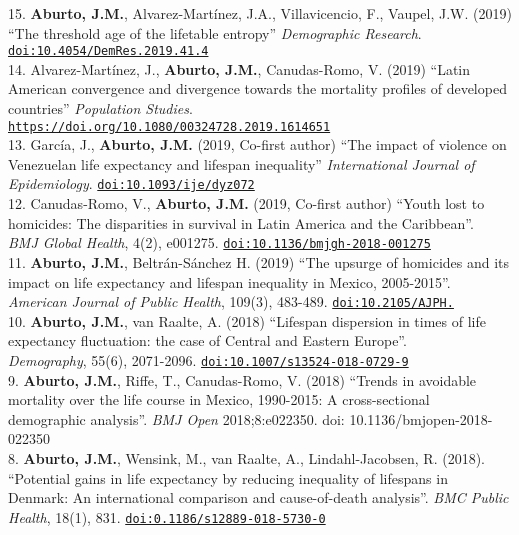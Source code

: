 \documentclass[12pt]{article}
\providecommand*\url[1]{\href{#1}{#1}}
\renewcommand*\url[1]{\href{#1}{\texttt{#1}}}
\begin{document}
15. \textbf{Aburto, J.M.}, Alvarez-Mart\'inez, J.A., Villavicencio, F., Vaupel, J.W. (2019) ``The threshold age of the lifetable entropy''  \textit{Demographic Research}. \url{doi:10.4054/DemRes.2019.41.4}\\

14. Alvarez-Mart\'inez, J., \textbf{Aburto, J.M.}, Canudas-Romo, V. (2019) ``Latin American convergence and divergence towards the mortality profiles of developed countries''\textit{ Population Studies}.\\ \url{https://doi.org/10.1080/00324728.2019.1614651} \\
  
13. Garc\'ia, J., \textbf{Aburto, J.M.} (2019, Co-first author) ``The impact of violence on Venezuelan life expectancy and lifespan inequality''  \textit{International Journal of Epidemiology}. \url{doi:10.1093/ije/dyz072}\\

12. Canudas-Romo, V., \textbf{Aburto, J.M.} (2019, Co-first author) ``Youth lost to homicides: The disparities in survival in Latin America and the Caribbean''. \\ \textit{BMJ Global Health}, 4(2), e001275. \url{doi:10.1136/bmjgh-2018-001275}\\

11. \textbf{Aburto, J.M.}, Beltr\'an-S\'anchez H. (2019) ``The upsurge of homicides and its impact on life expectancy and lifespan inequality in Mexico, 2005-2015''. \textit{ American Journal of Public Health}, 109(3), 483-489. \url{doi:10.2105/AJPH.}\\
 
10. \textbf{Aburto, J.M.}, van Raalte, A. (2018) ``Lifespan dispersion in times of life expectancy fluctuation: the case of Central and Eastern Europe''.\\ \textit{Demography}, 55(6), 2071-2096. \url{doi:10.1007/s13524-018-0729-9} \\

9. \textbf{Aburto, J.M.}, Riffe, T., Canudas-Romo, V. (2018) ``Trends in avoidable mortality over the life course in Mexico, 1990-2015:  A cross-sectional demographic analysis''. \emph{BMJ Open} 2018;8:e022350. doi: 10.1136/bmjopen-2018-022350 \\


8. \textbf{Aburto, J.M.}, Wensink, M., van Raalte, A., Lindahl-Jacobsen, R. (2018). ``Potential gains in life expectancy by reducing inequality of lifespans in Denmark: An international comparison and cause-of-death analysis''. \emph{BMC Public Health}, 18(1), 831. \url{doi:0.1186/s12889-018-5730-0} \\
  
\end{document}
